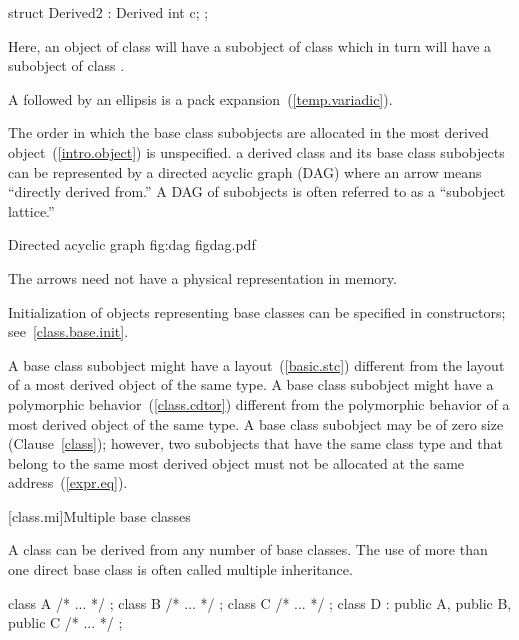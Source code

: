 \begin{codeblock}
struct Derived2 : Derived {
  int c;
};
\end{codeblock}

Here, an object of class  will have a subobject of class
 which in turn will have a subobject of class
.
\exitexample

\pnum
A  followed by an ellipsis is a pack
expansion~(\ref{temp.variadic}).

\pnum
The order in which the base class subobjects are allocated in the most
derived object~(\ref{intro.object}) is unspecified.
\enternote
{}%
%
a derived class and its base class subobjects can be represented by a
directed acyclic graph (DAG) where an arrow means ``directly derived
from.'' A DAG of subobjects is often referred to as a ``subobject
lattice.''

\begin{importgraphic}
{Directed acyclic graph}
{fig:dag}
{figdag.pdf}
\end{importgraphic}

\pnum
The arrows need not have a physical representation in memory.
\exitnote

\pnum
\enternote
Initialization of objects representing base classes can be specified in
constructors; see~\ref{class.base.init}.
\exitnote

\pnum
\enternote
A base class subobject might have a layout~(\ref{basic.stc}) different
from the layout of a most derived object of the same type. A base class
subobject might have a polymorphic behavior~(\ref{class.cdtor})
different from the polymorphic behavior of a most derived object of the
same type. A base class subobject may be of zero size (Clause~\ref{class});
however, two subobjects that have the same class type and that belong to
the same most derived object must not be allocated at the same
address~(\ref{expr.eq}).
\exitnote

[class.mi]{Multiple base classes}
%
%

\pnum
A class can be derived from any number of base classes.
\enternote
The use of more than one direct base class is often called multiple inheritance.
\exitnote
\enterexample
\begin{codeblock}
class A { /* ... */ };
class B { /* ... */ };
class C { /* ... */ };
class D : public A, public B, public C { /* ... */ };
\end{codeblock}
\exitexample

